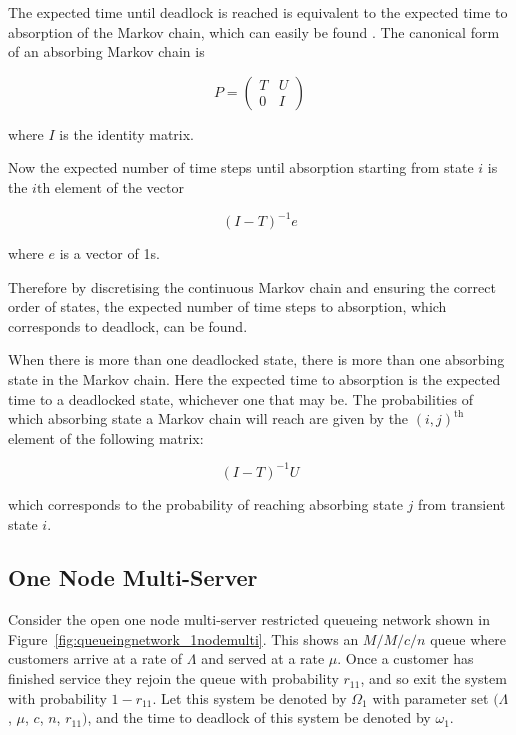 \documentclass{article}
\numberwithin{equation}{section}
\begin{document}
The expected time until deadlock is reached is equivalent to the expected time
to absorption of the Markov chain, which can easily be found \cite{stewart09}.
The canonical form of an absorbing Markov chain is

\begin{equation*}
P = \left(\begin{array}{cc} T & U\\ 0 & I \end{array} \right)
\end{equation*}

where $I$ is the identity matrix.

Now the expected number of time steps until absorption starting from state $i$
is the $i\text{th}$ element of the vector

\begin{equation} \label{eq:abs_probs}
  (I - T)^{-1}e
\end{equation}

where $e$ is a vector of 1s.

Therefore by discretising the continuous Markov chain and ensuring the correct
order of states, the expected number of time steps to absorption, which
corresponds to deadlock, can be found.

When there is more than one deadlocked state, there is more than one absorbing
state in the Markov chain.
Here the expected time to absorption is the expected time to a deadlocked
state, whichever one that may be.
The probabilities of which absorbing state a Markov chain will reach are given
by the $(i, j)^{\text{th}}$ element of the following matrix:

\begin{equation}
  (I - T)^{-1}U
\end{equation}

which corresponds to the probability of reaching absorbing state $j$ from
transient state $i$.


\subsection{One Node Multi-Server}\label{sec:1nodeMS}


Consider the open one node multi-server restricted queueing network shown in
Figure~\ref{fig:queueingnetwork_1nodemulti}.
This shows an \(M/M/c/n\) queue where customers arrive at a rate of $\Lambda$
and served at a rate $\mu$.
Once a customer has finished service they rejoin the queue with probability
$r_{11}$, and so exit the system with probability $1 - r_{11}$.
Let this system be denoted by $\Omega_1$ with parameter set $(\Lambda$, $\mu$,
$c$, $n$, $r_{11})$, and the time to deadlock of this system be denoted by
$\omega_1$.
\end{document}
